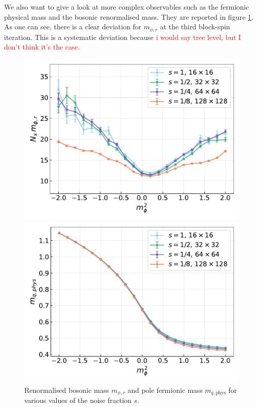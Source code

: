 We also want to give a look at more complex observables such as the fermionic physical mass and the bosonic renormalised mass. They are reported in figure \ref{fig:cooling_masses}. As one can see, there is a clear deviation for $m_{\phi, r}$ at the third block-spin iteration. This is a systematic deviation because \textcolor{red}{i would say tree level, but I don't think it's the case.}
\begin{figure}[hbp]
    \begin{minipage}{0.45\textwidth}
        \includegraphics[scale=0.45]{figures/cooling/mass_scan/mphir.pdf}
    \end{minipage}
    \hfill 
    \begin{minipage}{0.45\textwidth}
        \includegraphics[scale=0.45]{figures/cooling/mass_scan/mqphys.pdf}
    \end{minipage}
    \caption[Masses in the cooling procedure]{Renormalised bosonic mass $m_{\phi, r}$ and pole fermionic mass $m_{q,\text{phys}}$ for various values of the noise fraction $s$.}
    \label{fig:cooling_masses}
\end{figure} \\
